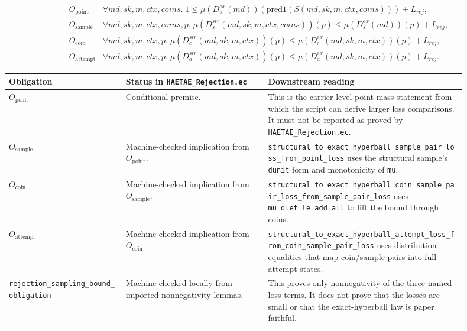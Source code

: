 \documentclass[11pt]{report}
\DeclareRobustCommand{\file}[1]{\ifmmode\text{\nolinkurl{#1}}\else\nolinkurl{#1}\fi}
\DeclareRobustCommand{\ec}[1]{\ifmmode\text{\nolinkurl{#1}}\else\nolinkurl{#1}\fi}
\theoremstyle{definition}
\theoremstyle{plain}
\begin{document}
\[
\begin{array}{ll}
O_{\mathrm{point}} &
  \forall md,sk,m,ctx,coins.\; 1 \le
  \mu(D_s^{ex}(md))(\mathrm{pred1}(S(md,sk,m,ctx,coins))) + L_{rej},\\[0.35em]
O_{\mathrm{sample}} &
  \forall md,sk,m,ctx,coins,p.\;
  \mu(D_s^{str}(md,sk,m,ctx,coins))(p) \le
  \mu(D_s^{ex}(md))(p) + L_{rej},\\[0.35em]
O_{\mathrm{coin}} &
  \forall md,sk,m,ctx,p.\;
  \mu(D_c^{str}(md,sk,m,ctx))(p) \le
  \mu(D_c^{ex}(md,sk,m,ctx))(p) + L_{rej},\\[0.35em]
O_{\mathrm{attempt}} &
  \forall md,sk,m,ctx,p.\;
  \mu(D_a^{str}(md,sk,m,ctx))(p) \le
  \mu(D_a^{ex}(md,sk,m,ctx))(p) + L_{rej}.
\end{array}
\]

\begin{longtable}{p{0.23\linewidth}p{0.28\linewidth}p{0.39\linewidth}}
\toprule
\textbf{Obligation} & \textbf{Status in \file{HAETAE\_Rejection.ec}} &
\textbf{Downstream reading} \\
\midrule
\(O_{\mathrm{point}}\) &
Conditional premise. &
This is the carrier-level point-mass statement from which the script can
derive larger loss comparisons.  It must not be reported as proved by
\file{HAETAE\_Rejection.ec}. \\
\midrule
\(O_{\mathrm{sample}}\) &
Machine-checked implication from \(O_{\mathrm{point}}\). &
\ec{structural\_to\_exact\_hyperball\_sample\_pair\_loss\_from\_point\_loss}
uses the structural sample's \ec{dunit} form and monotonicity of \ec{mu}. \\
\midrule
\(O_{\mathrm{coin}}\) &
Machine-checked implication from \(O_{\mathrm{sample}}\). &
\ec{structural\_to\_exact\_hyperball\_coin\_sample\_pair\_loss\_from\_sample\_pair\_loss}
uses \ec{mu\_dlet\_le\_add\_all} to lift the bound through coins. \\
\midrule
\(O_{\mathrm{attempt}}\) &
Machine-checked implication from \(O_{\mathrm{coin}}\). &
\ec{structural\_to\_exact\_hyperball\_attempt\_loss\_from\_coin\_sample\_pair\_loss}
uses distribution equalities that map coin/sample pairs into full attempt
states. \\
\midrule
\ec{rejection\_sampling\_bound\_obligation} &
Machine-checked locally from imported nonnegativity lemmas. &
This proves only nonnegativity of the three named loss terms.  It does not
prove that the losses are small or that the exact-hyperball law is paper
faithful. \\
\bottomrule
\end{longtable}
\end{document}
